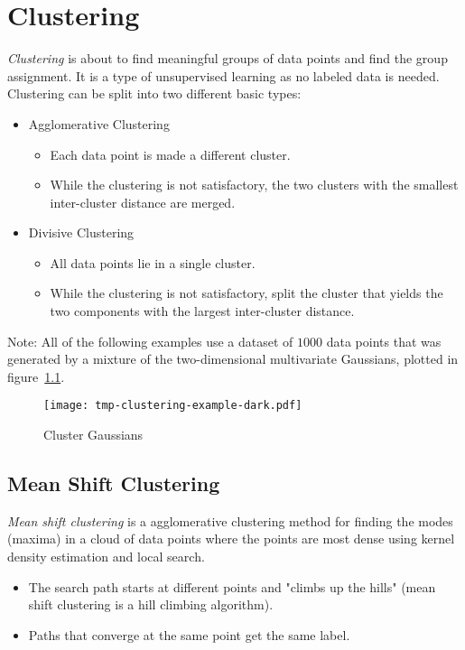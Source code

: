 \chapter{Clustering}
	\emph{Clustering} is about to find meaningful groups of data points and find the group assignment. It is a type of unsupervised learning as no labeled data is needed. Clustering can be split into two different basic types:
	\begin{itemize}
		\item Agglomerative Clustering
			\begin{itemize}
				\item Each data point is made a different cluster.
				\item While the clustering is not satisfactory, the two clusters with the smallest inter-cluster distance are merged.
			\end{itemize}
		\item Divisive Clustering
			\begin{itemize}
				\item All data points lie in a single cluster.
				\item While the clustering is not satisfactory, split the cluster that yields the two components with the largest inter-cluster distance.
			\end{itemize}
	\end{itemize}
	Note: All of the following examples use a dataset of \(1000\) data points that was generated by a mixture of the two-dimensional multivariate Gaussians, plotted in figure~\ref{fig:clusteringExample}.

	\begin{figure}
		\centering
		\texttt{[image: tmp-clustering-example-dark.pdf]}
		\caption{Cluster Gaussians}
		\label{fig:clusteringExample}
	\end{figure}

	\section{Mean Shift Clustering}
		\emph{Mean shift clustering} is a agglomerative clustering method for finding the modes (maxima) in a cloud of data points where the points are most dense using kernel density estimation and local search.
		\begin{itemize}
			\item The search path starts at different points and "climbs up the hills" (mean shift clustering is a hill climbing algorithm).
			\item Paths that converge at the same point get the same label.
		\end{itemize}

